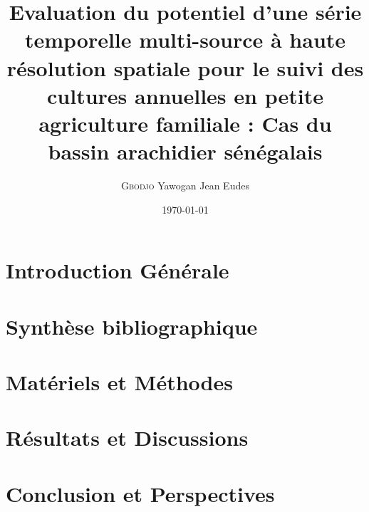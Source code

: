 \documentclass[a4paper,12pt,openany]{book}
\title{Evaluation du potentiel d’une série temporelle multi-source à haute résolution spatiale pour le suivi des cultures annuelles en petite agriculture familiale : 
Cas du bassin arachidier sénégalais}
\author{\textsc{Gbodjo} Yawogan Jean Eudes}
\date{\today}
\begin{document}
\maketitle

\frontmatter

  

\mainmatter

  \chapter{Introduction Générale}
  
  

  \chapter{Synthèse bibliographique}
  
  

  \chapter{Matériels et Méthodes}
  
  

  \chapter{Résultats et Discussions}
  
  
  
  \chapter{Conclusion et Perspectives}
  
  
  
\appendix

\backmatter





  
\end{document}
